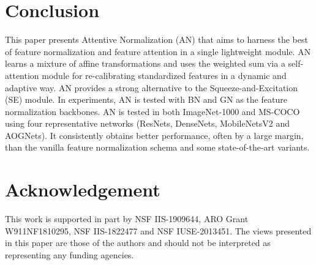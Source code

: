 \documentclass[runningheads]{llncs}
\begin{document}
\section{Conclusion}
This paper presents Attentive Normalization (AN) that aims to harness the best of feature normalization and feature attention in a single lightweight module. AN learns a mixture of affine transformations and uses the weighted sum via a self-attention module for re-calibrating standardized features in a dynamic and adaptive way. AN provides a strong alternative to the Squeeze-and-Excitation (SE) module. In experiments, AN is tested with BN and GN as the feature normalization backbones. AN is tested in both ImageNet-1000  and   MS-COCO using four representative networks (ResNets, DenseNets, MobileNetsV2 and AOGNets). It consistently obtains better performance, often by a large margin, than the vanilla feature normalization schema and some state-of-the-art variants.

\section*{Acknowledgement} 
This work is supported in part by NSF IIS-1909644, ARO Grant W911NF1810295, NSF IIS-1822477 and NSF IUSE-2013451.
The views presented in this paper are those of the authors and should not be interpreted as representing any funding agencies.



\end{document}
